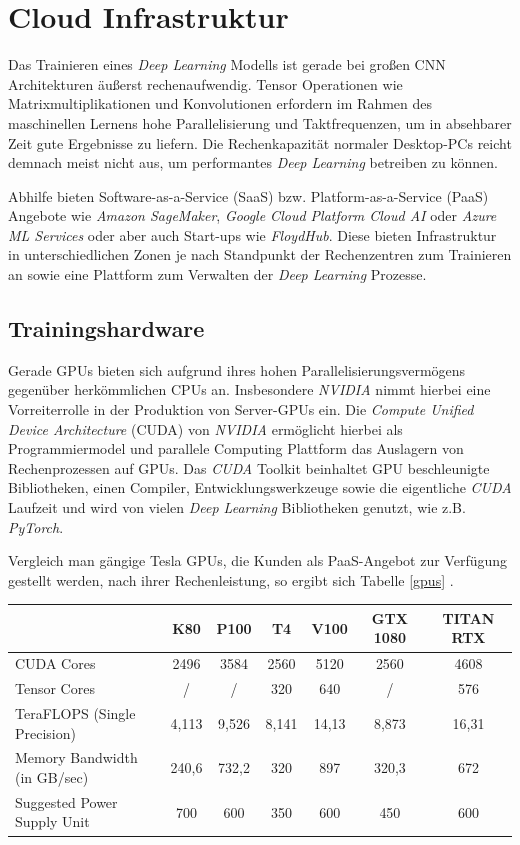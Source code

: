 \section{Cloud Infrastruktur}

Das Trainieren eines \textit{Deep Learning} Modells ist gerade bei großen CNN Architekturen äußerst rechenaufwendig. Tensor Operationen wie Matrixmultiplikationen und Konvolutionen erfordern im Rahmen des maschinellen Lernens hohe Parallelisierung und Taktfrequenzen, um in absehbarer Zeit gute Ergebnisse zu liefern. Die Rechenkapazität normaler Desktop-PCs reicht demnach meist nicht aus, um performantes \textit{Deep Learning} betreiben zu können. 

Abhilfe bieten Software-as-a-Service (SaaS) bzw. Platform-as-a-Service (PaaS) Angebote wie \textit{Amazon SageMaker}, \textit{Google Cloud Platform Cloud AI} oder \textit{Azure ML Services} oder aber auch Start-ups wie \textit{FloydHub}. Diese bieten Infrastruktur in unterschiedlichen Zonen je nach Standpunkt der Rechenzentren zum Trainieren an sowie eine Plattform zum Verwalten der \textit{Deep Learning} Prozesse. 

\subsection*{Trainingshardware}

Gerade GPUs bieten sich aufgrund ihres hohen Parallelisierungsvermögens gegenüber herkömmlichen CPUs an. Insbesondere \textit{NVIDIA} nimmt hierbei eine Vorreiterrolle in der Produktion von Server-GPUs ein. Die \textit{Compute Unified Device Architecture} (CUDA) von \textit{NVIDIA} ermöglicht hierbei als Programmiermodel und parallele Computing Plattform das Auslagern von Rechenprozessen auf GPUs. Das \textit{CUDA} Toolkit beinhaltet GPU beschleunigte Bibliotheken, einen Compiler, Entwicklungswerkzeuge sowie die eigentliche \textit{CUDA} Laufzeit und wird von vielen \textit{Deep Learning} Bibliotheken genutzt, wie z.B. \textit{PyTorch}. \cite{NVIDIA.20200209} \cite{PyTorch.20200209}

Vergleich man gängige Tesla GPUs, die Kunden als PaaS-Angebot zur Verfügung gestellt werden, nach ihrer Rechenleistung, so ergibt sich Tabelle \ref{gpus} \cite{TechPowerUp.20200209}.

\begin{center}
	\begin{tabular}[h]{l|c|c|c|c|c|c}
		& K80 & P100 & T4 & V100 & GTX 1080 & TITAN RTX \\
		\hline
		CUDA Cores & 2496 & 3584 & 2560 & 5120 & 2560 & 4608 \\
		Tensor Cores & / & / & 320 & 640 & / & 576 \\
		TeraFLOPS (Single Precision) & 4,113 & 9,526 & 8,141 & 14,13 & 8,873 & 16,31 \\
		Memory Bandwidth (in GB/sec) & 240,6 & 732,2 & 320 & 897 & 320,3 & 672 \\
		Suggested Power Supply Unit & 700 & 600 & 350 & 600 & 450 & 600
		\label{gpus}
	\end{tabular}
\end{center}

